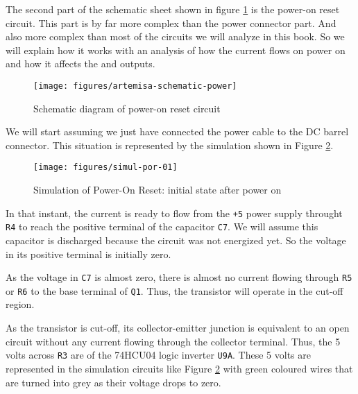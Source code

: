 The second part of the schematic sheet shown in figure \ref{fig:artemisa-schematic-por} is the power-on reset circuit. This part is by far more complex than the power connector part. And also more complex than most of the circuits we will analyze in this book. So we will explain how it works with an analysis of how the current flows on power on and how it affects the  and  outputs.

\begin{figure}[htbp]
  \centering
  \texttt{[image: figures/artemisa-schematic-power]}
  \caption{Schematic diagram of power-on reset circuit}
  \label{fig:artemisa-schematic-por}
\end{figure}

We will start assuming we just have connected the power cable to the DC barrel connector. This situation is represented by the simulation shown in Figure \ref{fig:simul-por-01}.

\begin{figure}[htb]
  \centering
  \texttt{[image: figures/simul-por-01]}
  \caption{Simulation of Power-On Reset: initial state after power on}
  \label{fig:simul-por-01}
\end{figure}

In that instant, the current is ready to flow from the {\tt +5} power supply throught {\tt R4} to reach the positive terminal of the capacitor {\tt C7}. We will assume this capacitor is discharged because the circuit was not energized yet. So the voltage in its positive terminal is initially zero.

As the voltage in {\tt C7} is almost zero, there is almost no current flowing through {\tt R5} or {\tt R6} to the base terminal of  {\tt Q1}. Thus, the transistor will operate in the cut-off region.

As the transistor is cut-off, its collector-emitter junction is equivalent to an open circuit without any current flowing through the collector terminal. Thus, the 5 volts across {\tt R3} are  of the 74HCU04 logic inverter {\tt U9A}. These 5 volts are represented in the simulation circuits like Figure \ref{fig:simul-por-01} with green coloured wires that are turned into grey as their voltage drops to zero.

